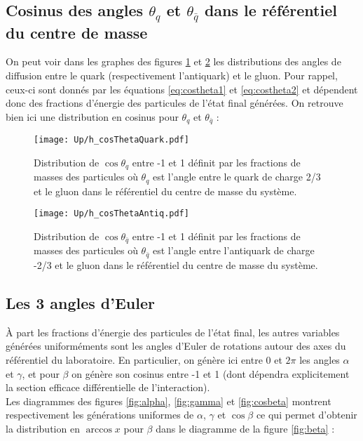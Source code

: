 \documentclass[a4paper]{article} %
\numberwithin{equation}{section} %
\theoremstyle{definition}
\theoremstyle{remark}
\theoremstyle{plain}%
\theoremstyle{style_exemple}
\begin{document}
\subsection{Cosinus des angles $\theta_q$ et $\theta_{\bar q}$ dans le référentiel du centre de masse}
On peut voir dans les graphes des figures \ref{fig:costheta_q} et \ref{fig:costheta_antiq} les distributions des angles de diffusion entre le quark (respectivement l'antiquark) et le gluon. Pour rappel, ceux-ci sont donnés par les équations \eqref{eq:costheta1} et \eqref{eq:costheta2} et dépendent donc des fractions d'énergie des particules de l'état final générées. On retrouve bien ici une distribution en cosinus pour $\theta_q$ et $\theta_{\bar q}$ :
\begin{figure}[H]
    \centering
    \texttt{[image: Up/h\_cosThetaQuark.pdf]}
    \begin{minipage}{12cm}
        \caption{Distribution de $\cos\theta_q$ entre -1 et 1 définit par les fractions de masses des particules où $\theta_q$ est l'angle entre le quark de charge 2/3 et le gluon dans le référentiel du centre de masse du système.}
        \label{fig:costheta_q}
    \end{minipage}
\end{figure}

\begin{figure}[H]
    \centering
    \texttt{[image: Up/h\_cosThetaAntiq.pdf]}
    \begin{minipage}{12cm}
        \caption{Distribution de $\cos\theta_{\bar q}$ entre -1 et 1 définit par les fractions de masses des particules où $\theta_{\bar q}$ est l'angle entre l'antiquark de charge -2/3 et le gluon dans le référentiel du centre de masse du système.}
        \label{fig:costheta_antiq}
    \end{minipage}
\end{figure}

\subsection{Les 3 angles d'Euler}

À part les fractions d'énergie des particules de l'état final, les autres variables générées uniforméments sont les angles d'Euler de rotations autour des axes du référentiel du laboratoire. En particulier, on génère ici entre 0 et $2\pi$ les angles $\alpha$ et $\gamma$, et pour $\beta$ on génère son cosinus entre -1 et 1 (dont dépendra explicitement la section efficace différentielle de l'interaction).\\
Les diagrammes des figures \ref{fig:alpha}, \ref{fig:gamma} et \ref{fig:cosbeta} montrent respectivement les générations uniformes de $\alpha$, $\gamma$ et $\cos\beta$ ce qui permet d'obtenir la distribution en $\arccos{x}$ pour $\beta$ dans le diagramme de la figure \ref{fig:beta} :
\end{document}
